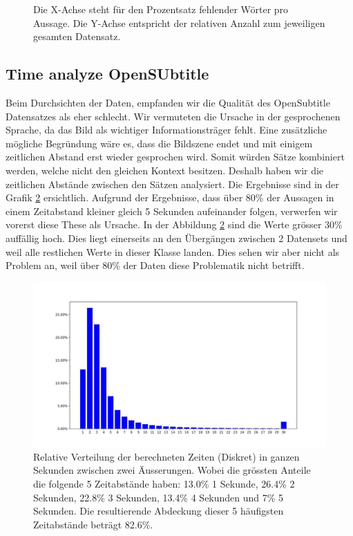 \begin{figure}[!htb]
	\centering
	\small
	\endminipage
	\caption{Die X-Achse steht für den Prozentsatz fehlender Wörter pro Aussage. Die Y-Achse entspricht der relativen Anzahl zum jeweiligen gesamten Datensatz.}
	\label{fig:data:reddit:vocab:analyze}
\end{figure}
\subsection{Time analyze OpenSUbtitle}
Beim Durchsichten der Daten, empfanden wir die Qualität des OpenSubtitle Datensatzes als eher schlecht. Wir vermuteten die Ursache in der gesprochenen Sprache, da das Bild als wichtiger Informationsträger fehlt. Eine zusätzliche mögliche Begründung wäre es, dass die Bildszene endet und mit einigem zeitlichen Abstand erst wieder gesprochen wird. Somit würden Sätze kombiniert werden, welche nicht den gleichen Kontext besitzen. Deshalb haben wir die zeitlichen Abstände zwischen den Sätzen analysiert. Die Ergebnisse sind in der Grafik \ref{fig:data:analyse:timediff:opus} ersichtlich. Aufgrund der Ergebnisse, dass über 80\% der Aussagen in einem Zeitabstand kleiner gleich 5 Sekunden aufeinander folgen, verwerfen wir vorerst diese These als Ursache. In der Abbildung \ref{fig:data:analyse:timediff:opus} sind die Werte grösser 30\% auffällig hoch. Dies liegt einerseits an den Übergängen zwischen 2 Datensets und weil alle restlichen Werte in dieser Klasse landen. Dies sehen wir aber nicht als Problem an, weil über 80\% der Daten diese Problematik nicht betrifft.
\begin{figure}[h]
	\centering
	\includegraphics[width=15cm]{img/opus_time_analyze.PNG}
	\caption{Relative Verteilung der berechneten Zeiten (Diskret) in ganzen Sekunden zwischen zwei Äusserungen. Wobei die grössten Anteile die folgende 5 Zeitabstände haben: 13.0\% 1 Sekunde, 26.4\% 2 Sekunden, 22.8\% 3 Sekunden, 13.4\% 4 Sekunden und 7\% 5 Sekunden. Die resultierende Abdeckung dieser 5 häufigsten Zeitabstände beträgt 82.6\%.}
	\label{fig:data:analyse:timediff:opus}
\end{figure}
